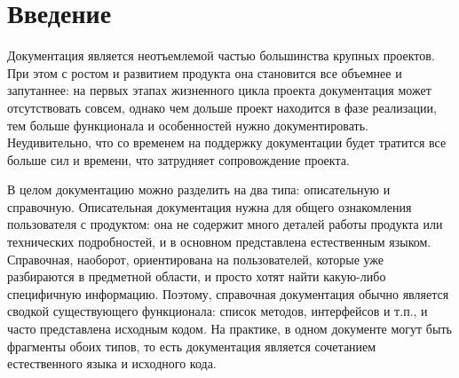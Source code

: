 \documentclass[14pt]{matmex-diploma-custom}
\begin{document}

\maketitle
\tableofcontents
\setcounter{secnumdepth}{4}

\section*{Введение}
Документация является неотъемлемой частью большинства крупных проектов. При этом с ростом и развитием продукта она становится все объемнее и запутаннее: на первых этапах жизненного цикла проекта документация может отсутствовать совсем, однако чем дольше проект находится в фазе реализации, тем больше функционала и особенностей нужно документировать. Неудивительно, что со временем на поддержку документации будет тратится все больше сил и времени, что затрудняет сопровождение проекта.

В целом документацию можно разделить на два типа: описательную и справочную\cite{bib:art:DocumTypes}. Описательная документация нужна для общего ознакомления пользователя с продуктом: она не содержит много деталей работы продукта или технических подробностей, и в основном представлена естественным языком. Справочная, наоборот, ориентирована на пользователей, которые уже разбираются в предметной области, и просто хотят найти какую-либо специфичную информацию. Поэтому, справочная документация обычно является сводкой существующего функционала: список методов, интерфейсов и т.п., и часто представлена исходным кодом. На практике, в одном документе могут быть фрагменты обоих типов, то есть документация является сочетанием естественного языка и исходного кода.
\end{document}
